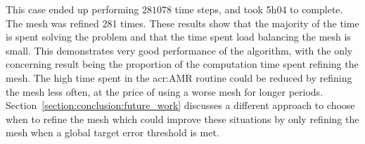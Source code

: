 This case ended up performing \(281078\) time steps, and took 5h04 to complete. The mesh was refined
281 times. These results show that the majority of the time is spent solving the problem and that
the time spent load balancing the mesh is small. This demonstrates very good performance of the
algorithm, with the only concerning result being the proportion of the computation time spent
refining the mesh. The high time spent in the \acrshort{acr:AMR} routine could be reduced by
refining the mesh less often, at the price of using a worse mesh for longer periods.
Section~\ref{section:conclusion:future_work} discusses a different approach to choose when to refine
the mesh which could improve these situations by only refining the mesh when a global target error
threshold is met.
